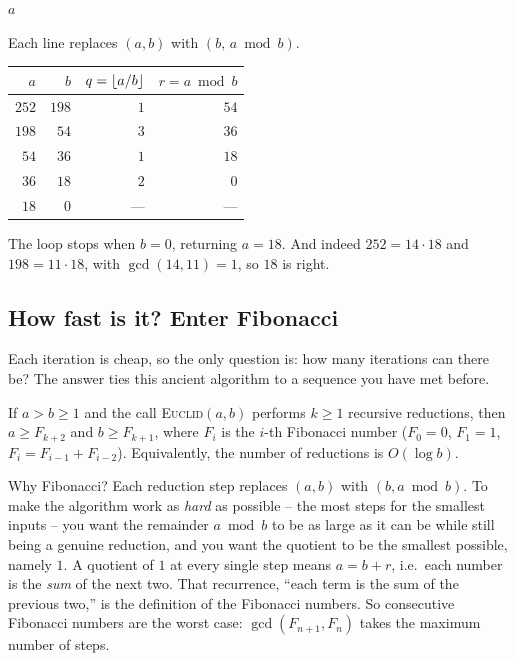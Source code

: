 \begin{algorithm}[H]
\caption{\textsc{Euclid}$(a,b)$ -- greatest common divisor}
\label{ch30:alg-euclid}
\Return $a$\;
\end{algorithm}

\begin{example}
\label{ch30:ex-euclid}
Each line replaces $(a,b)$ with $(b,\,a \bmod b)$.
\begin{center}
\begin{tabular}{r r r r}
\toprule
$a$ & $b$ & $q = \lfloor a/b\rfloor$ & $r = a \bmod b$ \\
\midrule
$252$ & $198$ & $1$ & $54$ \\
$198$ & $54$  & $3$ & $36$ \\
$54$  & $36$  & $1$ & $18$ \\
$36$  & $18$  & $2$ & $0$ \\
$18$  & $0$   & --- & --- \\
\bottomrule
\end{tabular}
\end{center}
The loop stops when $b = 0$, returning $a = 18$. And indeed $252 = 14 \cdot 18$
and $198 = 11 \cdot 18$, with $\gcd(14,11) = 1$, so $18$ is right.
\end{example}

\subsection{How fast is it? Enter Fibonacci}

Each iteration is cheap, so the only question is: how many iterations can there
be? The answer ties this ancient algorithm to a sequence you have met before.

\begin{theorem}
\label{ch30:thm-lame}
If $a > b \ge 1$ and the call \textsc{Euclid}$(a,b)$ performs $k \ge 1$
recursive reductions, then $a \ge F_{k+2}$ and $b \ge F_{k+1}$, where $F_i$ is the
$i$-th Fibonacci number ($F_0 = 0$, $F_1 = 1$, $F_{i} = F_{i-1} + F_{i-2}$). Equivalently, the number of reductions is $O(\log b)$.
\end{theorem}

\begin{intuitionbox}
Why Fibonacci? Each reduction step replaces $(a,b)$ with $(b, a \bmod b)$. To
make the algorithm work as \emph{hard} as possible -- the most steps for the
smallest inputs -- you want the remainder $a \bmod b$ to be as large as it can be
while still being a genuine reduction, and you want the quotient to be the
smallest possible, namely $1$. A quotient of $1$ at every single step means
$a = b + r$, i.e.\ each number is the \emph{sum} of the next two. That recurrence,
``each term is the sum of the previous two,'' is the definition of the Fibonacci
numbers. So consecutive Fibonacci numbers are the worst case: $\gcd(F_{n+1},
F_n)$ takes the maximum number of steps.
\end{intuitionbox}

